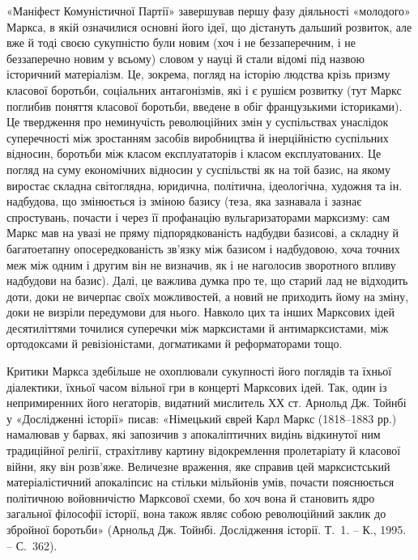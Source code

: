 «Маніфест Комуністичної Партії» завершував першу фазу діяльності 
«молодого» Маркса, в якій означилися основні його ідеї, що дістануть 
дальший розвиток, але вже й тоді своєю сукупністю були новим (хоч і не 
беззаперечним, і не беззаперечно новим у всьому) словом у науці й стали 
відомі під назвою історичний матеріалізм. Це, зокрема, погляд на 
історію людства крізь призму класової боротьби, соціальних 
антагонізмів, які і є рушієм розвитку (тут Маркс поглибив поняття 
класової боротьби, введене в обіг французькими істориками). Це 
твердження про неминучість революційних змін у суспільствах 
унаслідок суперечності між зростанням засобів виробництва й 
інерційністю суспільних відносин, боротьби між класом експлуататорів 
і класом експлуатованих. Це погляд на суму економічних відносин у 
суспільстві як на той базис, на якому виростає складна світоглядна, 
юридична, політична, ідеологічна, художня та ін. надбудова, що 
змінюється із зміною базису (теза, яка зазнавала і зазнає спростувань, 
почасти і через її профанацію вульгаризаторами марксизму: сам Маркс 
мав на увазі не пряму підпорядкованість надбудви базисові, а складну й 
багатоетапну опосередкованість зв'язку між базисом і надбудовою, хоча 
точних меж між одним і другим він не визначив, як і не наголосив 
зворотного впливу надбудови на базис). Далі, це важлива думка про те, що 
старий лад не відходить доти, доки не вичерпає своїх можливостей, а 
новий не приходить йому на зміну, доки не визріли передумови для нього. 
Навколо цих та інших Марксових ідей десятиліттями точилися суперечки 
між марксистами й антимарксистами, між ортодоксами й ревізіоністами, 
догматиками й реформаторами тощо.


Критики Маркса здебільше не охоплювали сукупності його поглядів та 
їхньої діалектики, їхньої часом вільної гри в концерті Марксових ідей. 
Так, один із непримиренних його негаторів, видатний мислитель ХХ ст. 
Арнольд Дж. Тойнбі у «Дослідженні історії» писав: «Німецький єврей 
Карл Маркс (1818--1883 рр.) намалював у барвах, які запозичив з 
апокаліптичних видінь відкинутої ним традиційної релігії, 
страхітливу картину відокремлення пролетаріату й класової війни, яку 
він розв'яже. Величезне враження, яке справив цей марксистський 
матеріалістичний апокаліпсис на стільки мільйонів умів, почасти 
пояснюється політичною войовничістю Марксової схеми, бо хоч вона й 
становить ядро загальної філософії історії, вона також являє собою 
революційний заклик до збройної боротьби» (Арнольд Дж. Тойнбі. 
Дослідження історії. Т.~1. -- К., 1995. -- С.~362). 


